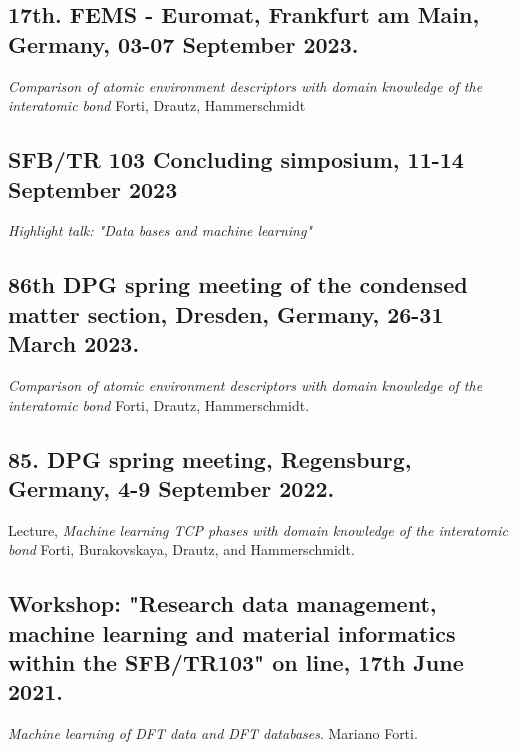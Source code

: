 \subsection{17th. FEMS - Euromat, Frankfurt am Main, Germany, 03-07 September 2023.}
\emph{Comparison of atomic environment descriptors with domain knowledge of the interatomic bond }
Forti, Drautz, Hammerschmidt %

\subsection{SFB/TR 103 Concluding simposium, 11-14 September 2023}
\emph{Highlight talk: "Data bases and machine learning"}

\subsection{86th DPG spring meeting of the condensed matter section, Dresden, Germany,  26-31 March 2023.}
\emph{Comparison of atomic environment descriptors with domain knowledge of the interatomic bond}
Forti, Drautz, Hammerschmidt. %

\subsection{85. DPG spring meeting, Regensburg, Germany,  4-9 September 2022.} Lecture,
\emph{Machine learning TCP phases with domain knowledge of the interatomic bond}
Forti, Burakovskaya, Drautz, and Hammerschmidt.

\subsection{Workshop: "Research data management, machine learning and material informatics within the SFB/TR103" on line, 17th June 2021.}
\emph{Machine learning of DFT data and DFT databases}. Mariano Forti. 

